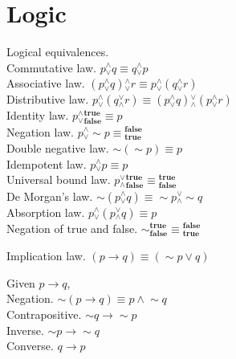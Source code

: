 \documentclass{slnotes}
\newcommand{\slnot}{\mathop{\sim}}
\newcommand{\landor}{\mathbin{{}^\land_\lor}}
\newcommand{\lorand}{\mathbin{{}^\lor_\land}}
\begin{document}
\chapter{Logic}
 Logical equivalences.\\
Commutative law. \(p \landor q \equiv q \landor p\)\\
Associative law. \((p \landor q) \landor r \equiv p \landor (q \landor r)\)\\
Distributive law. \(p \landor (q \lorand r) \equiv (p \landor q) \lorand (p \landor r)\)\\
Identity law. \(p \landor {}^\mathbf{true}_\mathbf{false} \equiv p\)\\
Negation law. \(p \landor \slnot p \equiv {}^\mathbf{false}_\mathbf{true}\)\\
Double negative law. \(\slnot(\slnot p) \equiv p\)\\
Idempotent law. \(p \landor p \equiv p\)\\
Universal bound law. \(p \lorand {}^\mathbf{true}_\mathbf{false} \equiv {}^\mathbf{true}_\mathbf{false}\)\\
De Morgan's law. \(\slnot(p \landor q) \equiv \slnot p \lorand \slnot q\)\\
Absorption law. \(p \landor (p \lorand q) \equiv p\)\\
Negation of true and false. \(\slnot{}^\mathbf{true}_\mathbf{false} \equiv {}^\mathbf{false}_\mathbf{true}\)

Implication law. \((p \to q) \equiv (\slnot p \lor q)\)

 Given \(p \to q\),\\
Negation. \(\slnot(p \to q) \equiv p \land\slnot q\)\\
Contrapositive. \(\slnot q \to \slnot p\)\\
Inverse. \(\slnot p \to \slnot q\)\\
Converse. \(q \to p\)
\end{document}
